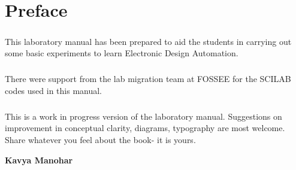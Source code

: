 \chapter*{Preface} 
\paragraph{}

This laboratory manual has been prepared to aid the students in carrying out some basic experiments to learn Electronic Design Automation.
\paragraph{}

There were support from the lab migration team at FOSSEE for the SCILAB codes used in this manual. 
\paragraph{}

This is a work in progress version of the laboratory manual. Suggestions on improvement in conceptual clarity, diagrams, typography are most welcome. Share whatever you feel about the book- it is yours.

\begin{flushright}
\textbf{Kavya Manohar}
\end{flushright}